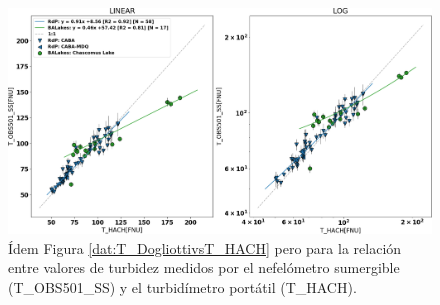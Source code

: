         \begin{figure}
        \centering
        \includegraphics[width=\textwidth]{dat/figures/ScatterT_OBS501_SSvsT_HACH.png}
        \caption[Relación entre valores de turbidez medidos con el nefelómetro sumergible (T\_OBS501\_SS) y el turbidímetro portátil (T\_HACH).]{Ídem Figura \ref{dat:T_DogliottivsT_HACH} pero para la relación entre valores de turbidez medidos por el nefelómetro sumergible (T\_OBS501\_SS) y el turbidímetro portátil (T\_HACH).}
        \label{dat:T_OBS501_SSvsT_HACH}
        \end{figure}

